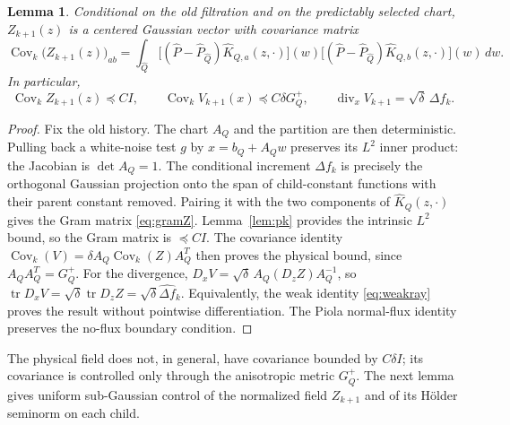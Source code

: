 \documentclass[11pt]{article}
\newtheorem{lemma}[lemma]{Lemma}
\theoremstyle{definition}
\theoremstyle{remark}
\numberwithin{equation}{section}
\newcommand{\divv}{\operatorname{div}}
\begin{document}
\begin{lemma}
\label{lem:piolaGaussian}
Conditional on the old filtration and on the predictably selected
chart, $Z_{k+1}(z)$ is a centered Gaussian vector with covariance
matrix
\begin{equation}\label{eq:gramZ}
 \operatorname{Cov}_k\bigl(Z_{k+1}(z)\bigr)_{ab}
 =\int_{\widehat Q}
 \bigl[(\widehat P-\widehat P_{\widehat Q})
       \widehat K_{Q,a}(z,\cdot)\bigr](w)
 \bigl[(\widehat P-\widehat P_{\widehat Q})
       \widehat K_{Q,b}(z,\cdot)\bigr](w)\,dw.
\end{equation}
In particular,
\begin{equation}\label{eq:covphysical}
 \operatorname{Cov}_k Z_{k+1}(z)\preceq CI,
 \qquad
 \operatorname{Cov}_k V_{k+1}(x)\preceq C\delta G_Q^+,
 \qquad
 \divv_x V_{k+1}=\sqrt\delta\,\Delta f_k.
\end{equation}
\end{lemma}
\begin{proof}
Fix the old history. The chart $A_Q$ and the partition are
then deterministic. Pulling back a white-noise test $g$ by
$x=b_Q+A_Qw$ preserves its $L^2$ inner product: the Jacobian is
$\det A_Q=1$. The conditional increment $\Delta f_k$ is
precisely the orthogonal Gaussian projection onto the span of
child-constant functions with their parent constant removed.
Pairing it with the two components of $\widehat K_Q(z,\cdot)$
gives the Gram matrix \eqref{eq:gramZ}. Lemma~\ref{lem:pk}
provides the intrinsic $L^2$ bound, so the Gram matrix is
$\preceq CI$. The covariance identity
$\operatorname{Cov}_k(V)=\delta A_Q\operatorname{Cov}_k(Z)A_Q^T$
then proves the physical bound, since $A_QA_Q^T=G_Q^+$.
For the divergence, $D_x V=\sqrt\delta\,A_Q(D_zZ)A_Q^{-1}$,
so $\operatorname{tr}D_xV=\sqrt\delta\operatorname{tr}D_zZ
=\sqrt\delta\widehat{\Delta f}_k$.
Equivalently, the weak identity \eqref{eq:weakray} proves the
result without pointwise differentiation. The Piola normal-flux
identity preserves the no-flux boundary condition.
\end{proof}

The physical field does not, in general, have covariance bounded
by $C\delta I$; its covariance is controlled only through the
anisotropic metric $G_Q^+$. The next lemma gives uniform
sub-Gaussian control of the normalized field $Z_{k+1}$ and of its
H\"older seminorm on each child.
\end{document}
